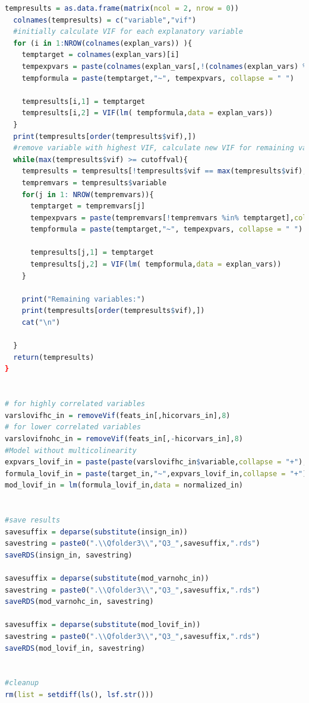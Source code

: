 \documentclass[11pt]{article}
\begin{document}
\begin{lstlisting}[language= R]
  tempresults = as.data.frame(matrix(ncol = 2, nrow = 0))
  colnames(tempresults) = c("variable","vif")
  #initially calculate VIF for each explanatory variable
  for (i in 1:NROW(colnames(explan_vars)) ){
    temptarget = colnames(explan_vars)[i]
    tempexpvars = paste(colnames(explan_vars[,!(colnames(explan_vars) %in% temptarget)]),collapse = "+")
    tempformula = paste(temptarget,"~", tempexpvars, collapse = " ")
    
    tempresults[i,1] = temptarget 
    tempresults[i,2] = VIF(lm( tempformula,data = explan_vars))
  }
  print(tempresults[order(tempresults$vif),])
  #remove variable with highest VIF, calculate new VIF for remaining variables until all VIF are below cutoff value
  while(max(tempresults$vif) >= cutoffval){
    tempresults = tempresults[!tempresults$vif == max(tempresults$vif),]
    tempremvars = tempresults$variable
    for(j in 1: NROW(tempremvars)){
      temptarget = tempremvars[j]
      tempexpvars = paste(tempremvars[!tempremvars %in% temptarget],collapse = "+")
      tempformula = paste(temptarget,"~", tempexpvars, collapse = " ")
      
      tempresults[j,1] = temptarget 
      tempresults[j,2] = VIF(lm( tempformula,data = explan_vars))
    }
    
    print("Remaining variables:")
    print(tempresults[order(tempresults$vif),])
    cat("\n")
    
  }
  return(tempresults)
}


# for highly correlated variables
varslovifhc_in = removeVif(feats_in[,hicorvars_in],8) 
# for lower correlated variables
varslovifnohc_in = removeVif(feats_in[,-hicorvars_in],8) 
#Model without multicolinearity
expvars_lovif_in = paste(paste(varslovifhc_in$variable,collapse = "+"),"+",paste(varslovifnohc_in$variable,collapse = "+"),collapse = "+")
formula_lovif_in = paste(target_in,"~",expvars_lovif_in,collapse = "+")
mod_lovif_in = lm(formula_lovif_in,data = normalized_in)


#save results
savesuffix = deparse(substitute(insign_in))
savestring = paste0(".\\Qfolder3\\","Q3_",savesuffix,".rds")
saveRDS(insign_in, savestring)

savesuffix = deparse(substitute(mod_varnohc_in))
savestring = paste0(".\\Qfolder3\\","Q3_",savesuffix,".rds")
saveRDS(mod_varnohc_in, savestring)

savesuffix = deparse(substitute(mod_lovif_in))
savestring = paste0(".\\Qfolder3\\","Q3_",savesuffix,".rds")
saveRDS(mod_lovif_in, savestring)


#cleanup
rm(list = setdiff(ls(), lsf.str()))
\end{lstlisting}
\end{document}
